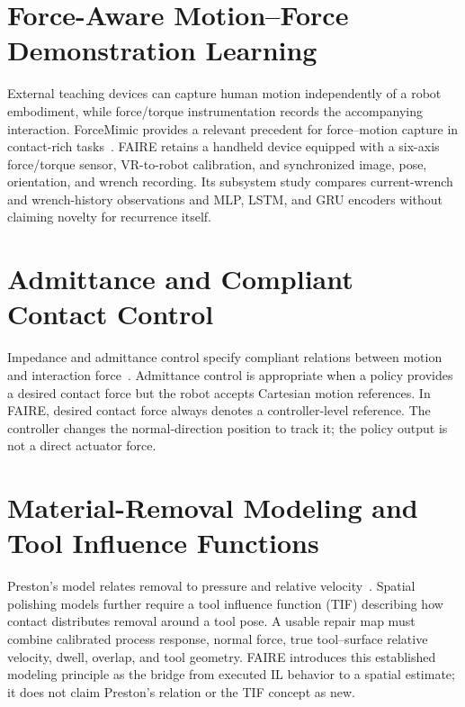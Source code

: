 \section[Force-Aware Motion--Force Demonstration Learning]{Force-Aware Motion--Force\\ Demonstration Learning}
External teaching devices can capture human motion independently of a robot embodiment, while force/torque instrumentation records the accompanying interaction. ForceMimic provides a relevant precedent for force--motion capture in contact-rich tasks~\cite{liu2025forcemimic}. FAIRE retains a handheld device equipped with a six-axis force/torque sensor, VR-to-robot calibration, and synchronized image, pose, orientation, and wrench recording. Its subsystem study compares current-wrench and wrench-history observations and MLP, LSTM, and GRU encoders without claiming novelty for recurrence itself.

\section{Admittance and Compliant Contact Control}
Impedance and admittance control specify compliant relations between motion and interaction force~\cite{hogan1985impedance,villani2008forcecontrol,keemink2018admittance}. Admittance control is appropriate when a policy provides a desired contact force but the robot accepts Cartesian motion references. In FAIRE, desired contact force always denotes a controller-level reference. The controller changes the normal-direction position to track it; the policy output is not a direct actuator force.

\section{Material-Removal Modeling and Tool Influence Functions}
Preston's model relates removal to pressure and relative velocity~\cite{preston1927theory}. Spatial polishing models further require a tool influence function (TIF) describing how contact distributes removal around a tool pose. A usable repair map must combine calibrated process response, normal force, true tool--surface relative velocity, dwell, overlap, and tool geometry. FAIRE introduces this established modeling principle as the bridge from executed IL behavior to a spatial estimate; it does not claim Preston's relation or the TIF concept as new.

